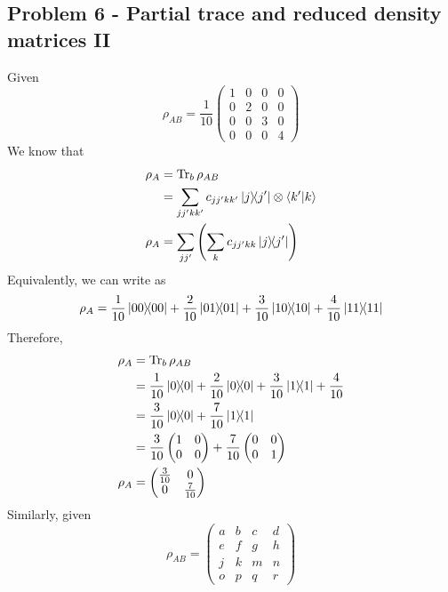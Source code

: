 \newpage
\subsection{Problem 6 - Partial trace and reduced density matrices II}
Given 
\begin{equation}
    \rho_{AB} = \frac{1}{10}\begin{pmatrix}1 & 0 & 0 & 0 \\ 0 & 2 & 0 & 0 \\ 0 & 0 & 3 & 0 \\ 0 & 0 & 0 & 4 \end{pmatrix} \label{rho_ab1}
\end{equation}
We know that 
\begin{align}
    \rho_A &= \Tr_b \rho_{AB} \\
    &= \sum_{jj'kk'}c_{jj'kk'} \ketbra{j}{j'} \otimes \braket{k'|k} \\
    \rho_A &= \sum_{jj'}\left(\sum_k c_{jj'kk} \ketbra{j}{j'} \right)
\end{align}
Equivalently, we can write \label{rho_ab1} as
\begin{equation}
    \rho_A = \frac{1}{10} \ketbra{00} + \frac{2}{10}\ketbra{01} + \frac{3}{10}\ketbra{10} + \frac{4}{10}\ketbra{11}
\end{equation}
Therefore,
\begin{align}
    \rho_A &= \Tr_b \rho_{AB} \\
    &= \frac{1}{10}\ketbra{0} + \frac{2}{10}\ketbra{0} + \frac{3}{10}\ketbra{1} + \frac{4}{10} \\
    &= \frac{3}{10}\ketbra{0} + \frac{7}{10}\ketbra{1}  \\ 
    &= \frac{3}{10} \begin{pmatrix}1 & 0 \\ 0 & 0\end{pmatrix} + \frac{7}{10} \begin{pmatrix}0 & 0 \\ 0 & 1\end{pmatrix} \\ 
    \rho_A &= \begin{pmatrix}\frac{3}{10} & 0 \\ 0 & \frac{7}{10}\end{pmatrix}
\end{align}
Similarly, given 
\begin{equation}
    \rho_{AB} = \begin{pmatrix}a & b & c & d \\ e & f & g & h \\ j & k & m & n \\ o & p & q & r \end{pmatrix}
\end{equation}
